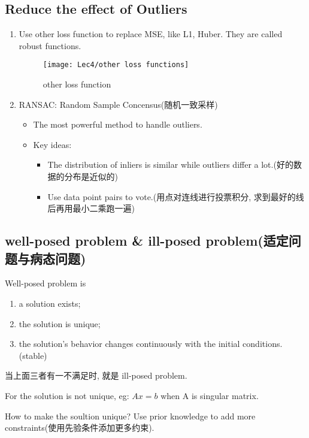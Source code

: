     \subsection{Reduce the effect of Outliers}
    \begin{enumerate}
        \item Use other loss function to replace MSE, like L1, Huber. They are called robust functions.
        \begin{figure}[H]
            \centering
            \texttt{[image: Lec4/other loss functions]}
            \caption{other loss function}
        \end{figure}
        \item RANSAC: Random Sample Concensus(随机一致采样)
        \begin{itemize}
            \item The most powerful method to handle outliers.
            \item Key ideas:
            \begin{itemize}
                \item The distribution of inliers is similar while outliers differ a lot.(好的数据的分布是近似的)
                \item  Use data point pairs to vote.(用点对连线进行投票积分, 求到最好的线后再用最小二乘跑一遍)
            \end{itemize}
        \end{itemize}
    \end{enumerate}
    \subsection{well-posed problem \& ill-posed problem(适定问题与病态问题)}
    Well-posed problem is 
    \begin{enumerate}
        \item a solution exists;
        \item  the solution is unique;
        \item the solution's behavior changes continuously with the initial conditions. (stable)
    \end{enumerate}

    当上面三者有一不满足时, 就是 ill-posed problem. 

    For the solution is not unique, eg: $Ax=b$ when A is singular matrix.

    How to make the soultion unique? Use prior knowledge to add more constraints(使用先验条件添加更多约束).
